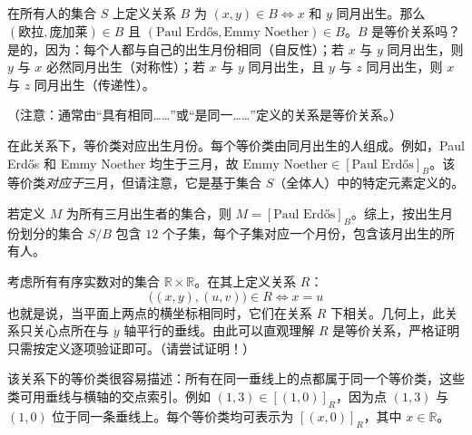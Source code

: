 \begin{example}
    在所有人的集合 $S$ 上定义关系 $B$ 为 $(x, y) \in B \iff x \text{\ 和\ } y \text{\ 同月出生}$。那么 $(\text{欧拉}, \text{庞加莱}) \in B$ 且 $(\text{Paul Erdős}, \text{Emmy Noether}) \in B$。$B$ 是等价关系吗？是的，因为：每个人都与自己的出生月份相同（自反性）；若 $x$ 与 $y$ 同月出生，则 $y$ 与 $x$ 必然同月出生（对称性）；若 $x$ 与 $y$ 同月出生，且 $y$ 与 $z$ 同月出生，则 $x$ 与 $z$ 同月出生（传递性）。

    （注意：通常由``具有相同……''或``是同一……''定义的关系是等价关系。）

    在此关系下，等价类对应出生月份。每个等价类由同月出生的人组成。例如，Paul Erdős 和 Emmy Noether 均生于三月，故 $\text{Emmy Noether} \in [\text{Paul Erdős}]_B$。该等价类\emph{对应于}三月，但请注意，它是基于集合 $S$（全体人）中的特定元素定义的。

    若定义 $M$ 为所有三月出生者的集合，则 $M = [\text{Paul Erdős}]_B$。综上，按出生月份划分的集合 $S/B$ 包含 $12$ 个子集，每个子集对应一个月份，包含该月出生的所有人。
\end{example}

\begin{example}
    考虑所有有序实数对的集合 $\mathbb{R} \times \mathbb{R}$。在其上定义关系 $R$：
    \[\big((x, y),(u, v)\big) \in R \iff x = u\]
    也就是说，当平面上两点的横坐标相同时，它们在关系 $R$ 下相关。几何上，此关系只关心点所在与 $y$ 轴平行的垂线。由此可以直观理解 $R$ 是等价关系，严格证明只需按定义逐项验证即可。（请尝试证明！）

    该关系下的等价类很容易描述：所有在同一垂线上的点都属于同一个等价类，这些类可用垂线与横轴的交点索引。例如 $(1, 3) \in [(1, 0)]_R$，因为点 $(1, 3)$ 与 $(1, 0)$ 位于同一条垂线上。每个等价类均可表示为 $[(x, 0)]_R$，其中 $x \in \mathbb{R}$。
\end{example}

\begin{center}
    {}
\end{center}

